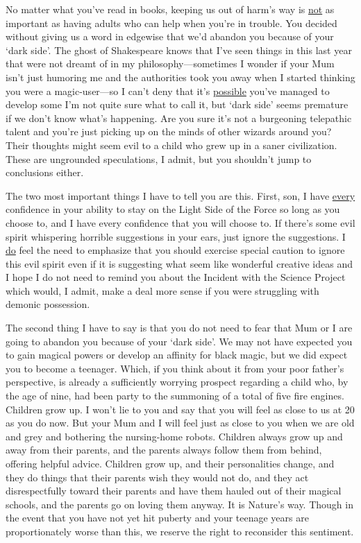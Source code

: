 \begin{writtenNote}

No matter what you've read in books, keeping us out of harm's way is
\underline{not} as important as having adults who can help when you're in
trouble. You decided without giving us a word in edgewise that we'd abandon you
because of your `dark side'. The ghost of Shakespeare knows that I've seen
things in this last year that were not dreamt of in my philosophy—sometimes I
wonder if your Mum isn't just humoring me and the authorities took you away
when I started thinking you were a magic-user—so I can't deny that it's
\underline{possible} you've managed to develop some{\el} I'm not quite sure
what to call it, but `dark side' seems premature if we don't know what's
happening. Are you sure it's not a burgeoning telepathic talent and you're just
picking up on the minds of other wizards around you? Their thoughts might seem
evil to a child who grew up in a saner civilization. These are ungrounded
speculations, I admit, but you shouldn't jump to conclusions either.

The two most important things I have to tell you are this. First, son, I
have \underline{every} confidence in your ability to stay on the Light Side of
the Force so long as you choose to, and I have every confidence that you will
choose to. If there's some evil spirit whispering horrible suggestions in your
ears, just ignore the suggestions. I \underline{do} feel the need to emphasize
that you should exercise special caution to ignore this evil spirit even if it
is suggesting what seem like wonderful creative ideas and I hope I do not need
to remind you about the Incident with the Science Project which would, I admit,
make a deal more sense if you were struggling with demonic possession.

The second thing I have to say is that you do not need to fear that Mum
or I are going to abandon you because of your `dark side'. We may not have
expected you to gain magical powers or develop an affinity for black magic, but
we did expect you to become a teenager. Which, if you think about it from your
poor father's perspective, is already a sufficiently worrying prospect
regarding a child who, by the age of nine, had been party to the summoning of a
total of five fire engines. Children grow up. I won't lie to you and say that
you will feel as close to us at 20 as you do now. But your Mum and I will feel
just as close to you when we are old and grey and bothering the nursing-home
robots. Children always grow up and away from their parents, and the parents
always follow them from behind, offering helpful advice. Children grow up, and
their personalities change, and they do things that their parents wish they
would not do, and they act disrespectfully toward their parents and have them
hauled out of their magical schools, and the parents go on loving them anyway.
It is Nature's way. Though in the event that you have not yet hit puberty and
your teenage years are proportionately worse than this, we reserve the right to
reconsider this sentiment.


\end{writtenNote}
